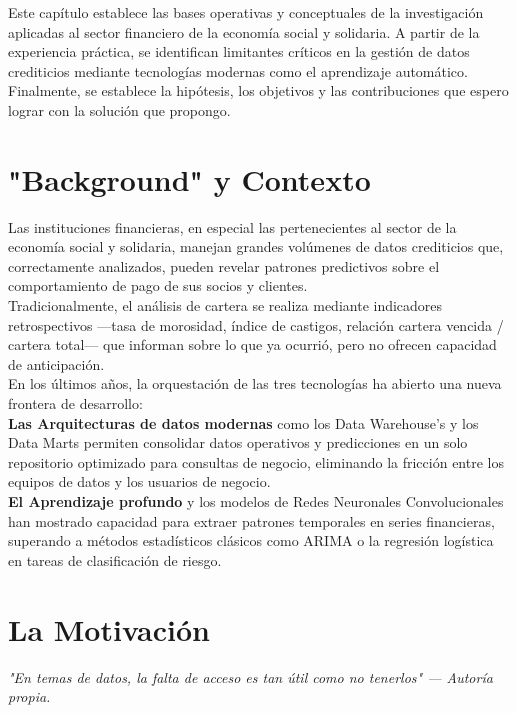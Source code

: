 Este capítulo establece las bases operativas y conceptuales de la investigación aplicadas al sector financiero de la economía social y solidaria. A partir de la experiencia práctica, se identifican limitantes críticos en la gestión de datos crediticios mediante tecnologías modernas como el aprendizaje automático. Finalmente, se establece la hipótesis, los objetivos y las contribuciones que espero lograr con la solución que propongo.

\section{"Background" y Contexto}

Las instituciones financieras, en especial las pertenecientes al sector de la economía social y solidaria, manejan grandes volúmenes de datos crediticios que, correctamente analizados, pueden revelar patrones predictivos sobre el comportamiento de pago de sus socios y clientes. \\
Tradicionalmente, el análisis de cartera se realiza mediante indicadores retrospectivos —tasa de morosidad, índice de castigos, relación cartera vencida / cartera total— que informan sobre lo que ya ocurrió, pero no ofrecen capacidad de anticipación.\\
En los últimos años, la orquestación de las tres tecnologías ha abierto una nueva frontera  de desarrollo:
\\
\newline\textbf{Las Arquitecturas de datos modernas} como los Data Warehouse's y los Data Marts permiten consolidar datos operativos y predicciones en un solo repositorio optimizado para consultas de negocio, eliminando la fricción entre los equipos de datos y los usuarios de negocio.
\\
\newline\textbf{El Aprendizaje profundo} y los modelos de Redes Neuronales Convolucionales han mostrado capacidad para extraer patrones temporales en series financieras, superando a métodos estadísticos clásicos como ARIMA o la regresión logística en tareas de clasificación de riesgo.

\section{La Motivación}

\begin{flushright}
    \small\itshape 
    "En temas de datos, la falta de acceso es tan útil como no tenerlos" 
    \vspace{0.2cm}  
    \normalfont--- Autoría propia. 
\end{flushright}

